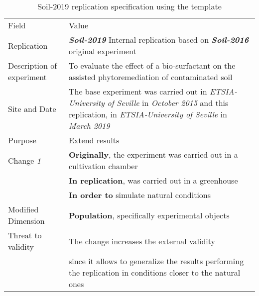 \begin{table*}[h]
  \caption{Soil-2019 replication specification using the template}
\label{tab:plantEng}
  \centering

\begin{tabularx}{\textwidth}{
  >{\hsize=0.25\hsize}X
  >{\hsize=0.8\hsize}X}
  
    \noalign{\smallskip}\hline\noalign{\smallskip}
  
  Field &  Value  \\ 
  \noalign{\smallskip}\hline\noalign{\smallskip}
  
  Replication &   \textbf{\emph{Soil-2019}}   Internal replication based on \textbf{\emph{Soil-2016}}  original experiment   \\
     
 Description \newline of experiment &  To evaluate the effect of a bio-surfactant on the assisted phytoremediation of contaminated soil \\  
 
 Site and Date & The base experiment was carried out in  \textit{ETSIA-University of Seville}  in  \textit{October 2015} and this replication, in  \textit{ETSIA-University of Seville} in \textit{March 2019}    \\
    Purpose  &  Extend results \\  
\hline   
    Change \textit{1}   & \textbf{Originally}, the experiment was carried out in a cultivation chamber \\& \textbf{In replication}, was carried out in a greenhouse \\& \textbf{In order to} simulate natural conditions \\
    
    Modified Dimension & 
    \textbf{Population}, specifically experimental objects  \\   
    Threat to validity  & The change increases the external validity \\
    & since it allows to generalize the results performing the replication in conditions closer to the natural ones \\  \hline
  

\end{tabularx}
\end{table*}
